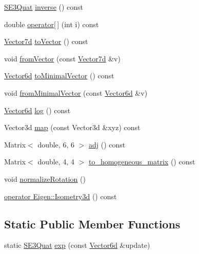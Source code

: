 \begin{DoxyCompactItemize}
\item 
\hyperlink{classg2o_1_1SE3Quat}{S\+E3\+Quat} \hyperlink{classg2o_1_1SE3Quat_a616c6599179b4b8fd619b7a8271a59ff}{inverse} () const 
\item 
double \hyperlink{classg2o_1_1SE3Quat_a20fbcb1726ebf6b7694c6ebf44053070}{operator\mbox{[}$\,$\mbox{]}} (int i) const 
\item 
\hyperlink{namespaceg2o_a4740ec41130f2ecc628c81f71261c8de}{Vector7d} \hyperlink{classg2o_1_1SE3Quat_a0d600cd91fd366f4c4604bb4964db378}{to\+Vector} () const 
\item 
void \hyperlink{classg2o_1_1SE3Quat_a59aa7dffe9320761ee65bcdfa2bc61fd}{from\+Vector} (const \hyperlink{namespaceg2o_a4740ec41130f2ecc628c81f71261c8de}{Vector7d} \&v)
\item 
\hyperlink{namespaceg2o_a3bc8a4fbac86f158d548be81af2f929b}{Vector6d} \hyperlink{classg2o_1_1SE3Quat_a5a33ee8d7795498f92588c8e33f7d1f3}{to\+Minimal\+Vector} () const 
\item 
void \hyperlink{classg2o_1_1SE3Quat_a65714851482e99558401d4ea66edb183}{from\+Minimal\+Vector} (const \hyperlink{namespaceg2o_a3bc8a4fbac86f158d548be81af2f929b}{Vector6d} \&v)
\item 
\hyperlink{namespaceg2o_a3bc8a4fbac86f158d548be81af2f929b}{Vector6d} \hyperlink{classg2o_1_1SE3Quat_a030bf8ba5f8ad0fa6f83d0c39bd22201}{log} () const 
\item 
Vector3d \hyperlink{classg2o_1_1SE3Quat_a9362387ec7f96589ebbdafb25abe50a4}{map} (const Vector3d \&xyz) const 
\item 
Matrix$<$ double, 6, 6 $>$ \hyperlink{classg2o_1_1SE3Quat_aa789e613e540b2f28b02b663c67c4f83}{adj} () const 
\item 
Matrix$<$ double, 4, 4 $>$ \hyperlink{classg2o_1_1SE3Quat_a942d8c3fc4de26560eaf187315700c5b}{to\+\_\+homogeneous\+\_\+matrix} () const 
\item 
void \hyperlink{classg2o_1_1SE3Quat_a0e2c54c6dfdaa71b677556a9d8e4e88a}{normalize\+Rotation} ()
\item 
\hyperlink{classg2o_1_1SE3Quat_ab71ee71bcff36763d611d63df72b04ca}{operator Eigen\+::\+Isometry3d} () const 
\end{DoxyCompactItemize}
\subsection*{Static Public Member Functions}
\begin{DoxyCompactItemize}
\item 
static \hyperlink{classg2o_1_1SE3Quat}{S\+E3\+Quat} \hyperlink{classg2o_1_1SE3Quat_a374a05b202889d09d5a3a25e0fb6c103}{exp} (const \hyperlink{namespaceg2o_a3bc8a4fbac86f158d548be81af2f929b}{Vector6d} \&update)
\end{DoxyCompactItemize}
